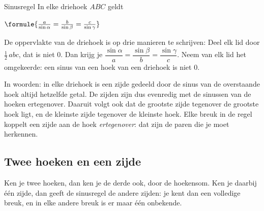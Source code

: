\begin{theorie}
\begin{stelling}{Sinusregel}
In elke driehoek $ABC$ geldt

\vspace{1mm}
\qquad $\formule{\frac{a}{\sin\alpha} = \frac{b}{\sin\beta} = \frac{c}{\sin\gamma}}$
\end{stelling}

\begin{bewijs}
De oppervlakte van de driehoek is op drie manieren te schrijven:
Deel elk lid door $\tfrac12\, abc$, dat is niet 0. Dan krijg je $\dfrac{\sin\alpha}{a} = \dfrac{\sin\beta}{b} = \dfrac{\sin\gamma}{c}$. Neem van elk lid het omgekeerde: een sinus van een hoek van een driehoek is niet 0.
\end{bewijs}
\end{theorie}

In woorden: in elke driehoek is een zijde gedeeld door de sinus van de overstaande hoek altijd hetzelfde getal. De zijden zijn dus evenredig met de sinussen van de hoeken ertegenover. Daaruit volgt ook dat de grootste zijde tegenover de grootste hoek ligt, en de kleinste zijde tegenover de kleinste hoek. Elke breuk in de regel koppelt een zijde aan de hoek \textit{ertegenover}: dat zijn de paren die je moet herkennen.

\subsection{Twee hoeken en een zijde}

Ken je twee hoeken, dan ken je de derde ook, door de hoekensom. Ken je daarbij één zijde, dan geeft de sinusregel de andere zijden: je kent dan een volledige breuk, en in elke andere breuk is er maar één onbekende.


